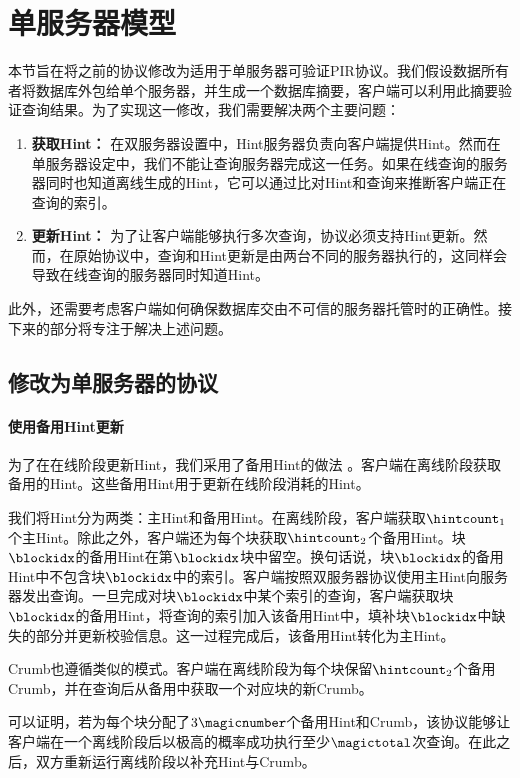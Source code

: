 \section{单服务器模型}
本节旨在将之前的协议修改为适用于单服务器可验证PIR协议。我们假设数据所有者将数据库外包给单个服务器，并生成一个数据库摘要，客户端可以利用此摘要验证查询结果。为了实现这一修改，我们需要解决两个主要问题：
\begin{enumerate}
    \item \textbf{获取Hint：} 在双服务器设置中，Hint服务器负责向客户端提供Hint。然而在单服务器设定中，我们不能让查询服务器完成这一任务。如果在线查询的服务器同时也知道离线生成的Hint，它可以通过比对Hint和查询来推断客户端正在查询的索引。
    \item \textbf{更新Hint：} 为了让客户端能够执行多次查询，协议必须支持Hint更新。然而，在原始协议中，查询和Hint更新是由两台不同的服务器执行的，这同样会导致在线查询的服务器同时知道Hint。
\end{enumerate}

此外，还需要考虑客户端如何确保数据库交由不可信的服务器托管时的正确性。接下来的部分将专注于解决上述问题。

\subsection{修改为单服务器的协议}
\paragraph{使用备用Hint更新}
为了在在线阶段更新Hint，我们采用了备用Hint的做法 \cite{EC:CorHenKog22}。客户端在离线阶段获取备用的Hint。这些备用Hint用于更新在线阶段消耗的Hint。

我们将Hint分为两类：主Hint和备用Hint。在离线阶段，客户端获取$\hintcount_1$个主Hint。除此之外，客户端还为每个块获取$\hintcount_2$个备用Hint。块$\blockidx$的备用Hint在第$\blockidx$块中留空。换句话说，块$\blockidx$的备用Hint中不包含块$\blockidx$中的索引。客户端按照双服务器协议使用主Hint向服务器发出查询。一旦完成对块$\blockidx$中某个索引的查询，客户端获取块$\blockidx$的备用Hint，将查询的索引加入该备用Hint中，填补块$\blockidx$中缺失的部分并更新校验信息。这一过程完成后，该备用Hint转化为主Hint。

Crumb也遵循类似的模式。客户端在离线阶段为每个块保留$\hintcount_2$个备用Crumb，并在查询后从备用中获取一个对应块的新Crumb。

可以证明，若为每个块分配了$3\magicnumber$个备用Hint和Crumb，该协议能够让客户端在一个离线阶段后以极高的概率成功执行至少$\magictotal$次查询。在此之后，双方重新运行离线阶段以补充Hint与Crumb。

